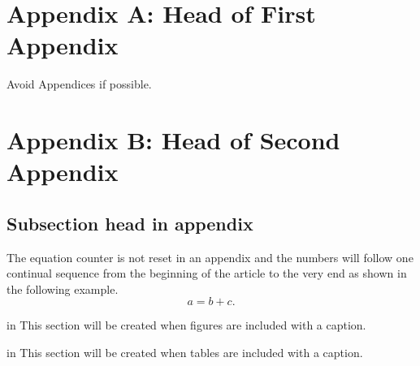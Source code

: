 \documentclass[11pt,cleanfoot]{asme2ej}
\begin{document}




\newpage
\appendix       %
\section*{Appendix A: Head of First Appendix}
Avoid Appendices if possible.

\section*{Appendix B: Head of Second Appendix}
\subsection*{Subsection head in appendix}
The equation counter is not reset in an appendix and the numbers will
follow one continual sequence from the beginning of the article to the very end as shown in the following example.
\begin{equation}
a = b + c.
\end{equation}

\newpage
\listoffigures

 in
This section will be created when figures are included with a caption.

\newpage
\listoftables

 in
This section will be created when tables are included with a caption.
\end{document}
